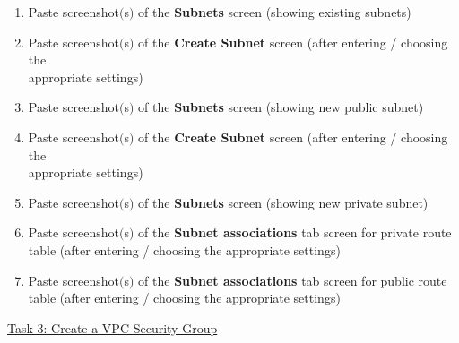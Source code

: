 \documentclass[11pt]{article}
\begin{document}
\begin{enumerate}[resume]
    \item Paste screenshot$($s$)$ of the \textbf{Subnets} screen (showing existing subnets) \\
    \vspace{5mm}
    
    \item Paste screenshot$($s$)$ of the \textbf{Create Subnet} screen (after entering / choosing the \\ appropriate settings) \\
    \vspace{5mm}
    
    \item Paste screenshot$($s$)$ of the \textbf{Subnets} screen (showing new public subnet) \\
    \vspace{5mm}
    
    \item Paste screenshot$($s$)$ of the \textbf{Create Subnet} screen (after entering / choosing the \\ appropriate settings) \\
    \vspace{5mm}
    
    \item Paste screenshot$($s$)$ of the \textbf{Subnets} screen (showing new private subnet) \\
    \vspace{5mm}
    
    \item Paste screenshot$($s$)$  of the \textbf{Subnet associations} tab screen for private route table (after entering / choosing the appropriate settings) \\
    \vspace{5mm}
    
    \item Paste screenshot$($s$)$ of the \textbf{Subnet associations} tab screen for public route table (after entering / choosing the appropriate settings) \\
    \vspace{5mm}
\end{enumerate}


\vspace{1cm}

\noindent\underline{Task 3: Create a VPC Security Group}
\end{document}
